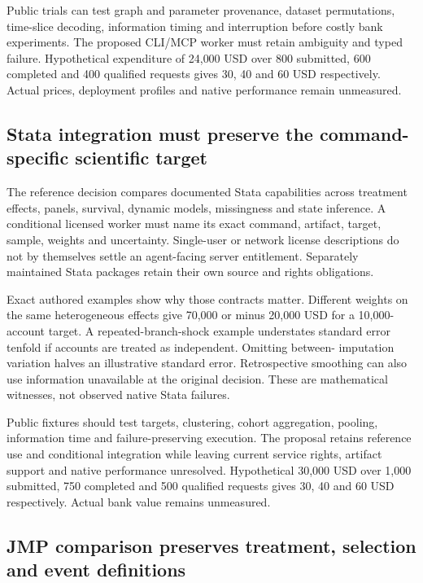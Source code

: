 Public trials can test graph and parameter provenance, dataset
permutations, time-slice decoding, information timing and interruption
before costly bank experiments. The proposed CLI/MCP worker must retain
ambiguity and typed failure. Hypothetical expenditure of 24,000 USD over
800 submitted, 600 completed and 400 qualified requests gives 30, 40 and
60 USD respectively. Actual prices, deployment profiles and native
performance remain unmeasured. \citep{exec24_smile_choice}

\hypertarget{stata-integration-must-preserve-the-command-specific-scientific-target}{%
\subsection{Stata integration must preserve the command-specific
scientific
target}\label{stata-integration-must-preserve-the-command-specific-scientific-target}}

The reference decision compares documented Stata capabilities across
treatment effects, panels, survival, dynamic models, missingness and
state inference. A conditional licensed worker must name its exact
command, artifact, target, sample, weights and uncertainty. Single-user
or network license descriptions do not by themselves settle an
agent-facing server entitlement. Separately maintained Stata packages
retain their own source and rights obligations.
\citep{exec24_stata_choice}

Exact authored examples show why those contracts matter. Different
weights on the same heterogeneous effects give 70,000 or minus 20,000
USD for a 10,000-account target. A repeated-branch-shock example
understates standard error tenfold if accounts are treated as
independent. Omitting between- imputation variation halves an
illustrative standard error. Retrospective smoothing can also use
information unavailable at the original decision. These are mathematical
witnesses, not observed native Stata failures.
\citep{exec24_stata_choice}

Public fixtures should test targets, clustering, cohort aggregation,
pooling, information time and failure-preserving execution. The proposal
retains reference use and conditional integration while leaving current
service rights, artifact support and native performance unresolved.
Hypothetical 30,000 USD over 1,000 submitted, 750 completed and 500
qualified requests gives 30, 40 and 60 USD respectively. Actual bank
value remains unmeasured. \citep{exec24_stata_choice}

\hypertarget{jmp-comparison-preserves-treatment-selection-and-event-definitions}{%
\subsection{JMP comparison preserves treatment, selection and event
definitions}\label{jmp-comparison-preserves-treatment-selection-and-event-definitions}}


